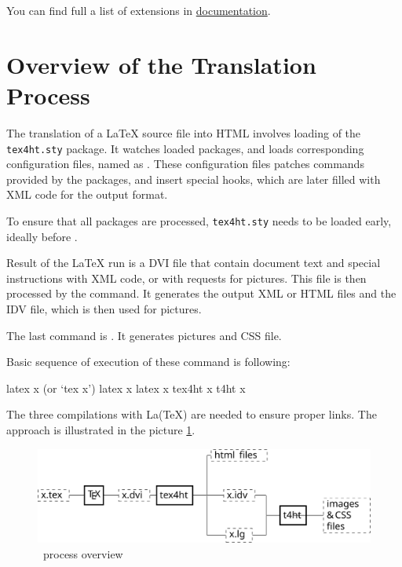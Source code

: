 You can find full a list of extensions in \href{https://www.kodymirus.cz/make4ht/make4ht-doc.html#extensions}{\makefourht{} documentation}.


\section{Overview of the Translation Process}\label{sec:overview}


The translation of a LaTeX source file into HTML involves loading of
the \texttt{tex4ht.sty} package. It watches loaded packages, and loads
corresponding configuration files, named as . 
These configuration files patches commands provided by the packages, and
insert special hooks, which are later filled with XML code for the output format.

To ensure that all packages are processed, \texttt{tex4ht.sty} needs to be 
loaded early, ideally before .

Result of the \LaTeX{} run is a DVI file that contain document text and 
special instructions with XML code, or with requests for pictures. 
This file is then processed by the  command. It generates
the output XML or HTML files and the IDV file, which is then used for 
pictures. 

The last command is . It generates pictures and CSS file.

Basic sequence of execution of these command is following:

\begin{shellcommand}
latex      x            (or ‘tex x’) 
latex      x 
latex      x 
tex4ht     x 
t4ht       x 
\end{shellcommand}

The three compilations with La(\TeX) are needed to ensure proper links. The approach is illustrated in the picture \ref{fig:process}. 

\begin{figure}
  \includegraphics[width=\textwidth]{images/tex4ht_process/tex4ht_process}
  \caption{\texfourht\ process overview}
  \label{fig:process}
\end{figure}

